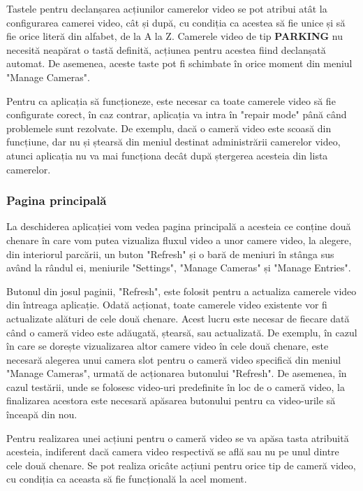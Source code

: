 \documentclass[12pt]{article}
\begin{document}
Tastele pentru declanșarea acțiunilor camerelor video se pot atribui at\^{a}t la configurarea camerei video, c\^{a}t și dup\u{a}, cu condiția ca acestea s\u{a} fie unice și s\u{a} fie orice liter\u{a} din alfabet, de la A la Z. Camerele video de tip \textbf{PARKING} nu necesit\u{a} neap\u{a}rat o tast\u{a} definit\u{a}, acțiunea pentru acestea fiind declanșat\u{a} automat. De asemenea, aceste taste pot fi schimbate \^{i}n orice moment din meniul "Manage Cameras". 

Pentru ca aplicația s\u{a} funcționeze, este necesar ca toate camerele video s\u{a} fie configurate corect, \^{i}n caz contrar, aplicația va intra \^{i}n "repair mode" p\^{a}n\u{a} c\^{a}nd problemele sunt rezolvate. De exemplu, dac\u{a} o camer\u{a} video este scoas\u{a} din funcțiune, dar nu și ștears\u{a} din meniul destinat administr\u{a}rii camerelor video, atunci aplicația nu va mai funcționa dec\^{a}t dup\u{a} ștergerea acesteia din lista camerelor.

\subsubsection{Pagina principal\u{a}}

La deschiderea aplicației vom vedea pagina principal\u{a} a acesteia ce conține dou\u{a} chenare \^{i}n care vom putea vizualiza fluxul video a unor camere video, la alegere, din interiorul parc\u{a}rii, un buton "Refresh" și o bar\u{a} de meniuri \^{i}n st\^{a}nga sus av\^{a}nd la r\^{a}ndul ei, meniurile "Settings", "Manage Cameras" și "Manage Entries".

Butonul din josul paginii, "Refresh", este folosit pentru a actualiza camerele video din \^{i}ntreaga aplicație. Odat\u{a} acționat, toate camerele video existente vor fi actualizate al\u{a}turi de cele dou\u{a} chenare. Acest lucru este necesar de fiecare dat\u{a} c\^{a}nd o camer\u{a} video este ad\u{a}ugat\u{a}, ștears\u{a}, sau actualizat\u{a}. De exemplu, \^{i}n cazul \^{i}n care se dorește vizualizarea altor camere video \^{i}n cele dou\u{a} chenare, este necesar\u{a} alegerea unui camera slot pentru o camer\u{a} video specific\u{a} din meniul "Manage Cameras", urmat\u{a} de acționarea butonului "Refresh". De asemenea, \^{i}n cazul test\u{a}rii, unde se folosesc video-uri predefinite \^{i}n loc de o camer\u{a} video, la finalizarea acestora este necesar\u{a} ap\u{a}sarea butonului pentru ca video-urile s\u{a} \^{i}nceap\u{a} din nou.

Pentru realizarea unei acțiuni pentru o camer\u{a} video se va ap\u{a}sa tasta atribuit\u{a} acesteia, indiferent dac\u{a} camera video respectiv\u{a} se afl\u{a} sau nu pe unul dintre cele dou\u{a} chenare. Se pot realiza oric\^{a}te acțiuni pentru orice tip de camer\u{a} video, cu condiția ca aceasta s\u{a} fie funcțional\u{a} la acel moment.
\end{document}
